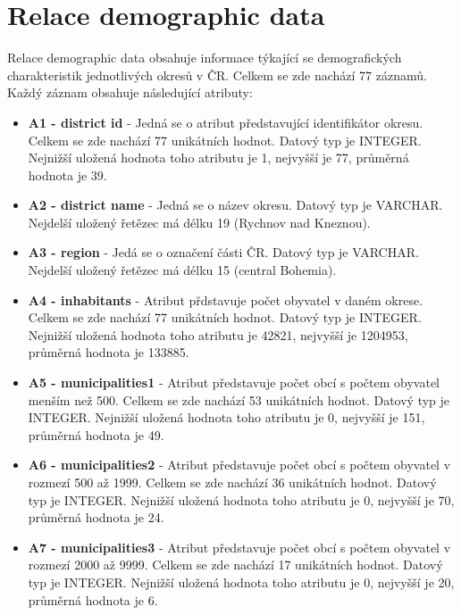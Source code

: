 \documentclass{article}
\begin{document}
\section{Relace demographic data}

Relace demographic data obsahuje informace týkající se demografických charakteristik jednotlivých okresů v ČR. Celkem se zde nachází 77 záznamů. Každý záznam obsahuje následující atributy:


\begin{itemize}

				
	\item \textbf{A1 - district id} -  Jedná se o atribut představující identifikátor okresu. Celkem se zde nachází 77 unikátních hodnot. Datový typ je INTEGER. Nejnižší uložená hodnota toho atributu je 1, nejvyšší je 77, průměrná hodnota je 39.
	
	\item \textbf{A2 - district name} -  Jedná se o název okresu. Datový typ je VARCHAR. Nejdelší uložený řetězec má délku 19 (Rychnov nad Kneznou).
 
	
	\item \textbf{A3 - region} -  Jedá se o označení části ČR. Datový typ je VARCHAR. Nejdelší uložený řetězec má délku 15 (central Bohemia).
	
	\item \textbf{A4 - inhabitants} -  Atribut přdstavuje počet obyvatel v daném okrese. Celkem se zde nachází 77 unikátních hodnot. Datový typ je INTEGER. Nejnižší uložená hodnota toho atributu je 42821, nejvyšší je 1204953, průměrná hodnota je 133885.
	
	\item \textbf{A5 - municipalities1} -  Atribut představuje počet obcí s počtem obyvatel menším než 500. Celkem se zde nachází 53 unikátních hodnot. Datový typ je INTEGER. Nejnižší uložená hodnota toho atributu je 0, nejvyšší je 151, průměrná hodnota je 49.
	
	
	\item \textbf{A6 - municipalities2} - Atribut představuje počet obcí s počtem obyvatel v rozmezí 500 až 1999. Celkem se zde nachází 36 unikátních hodnot. Datový typ je INTEGER. Nejnižší uložená hodnota toho atributu je 0, nejvyšší je 70, průměrná hodnota je 24. 
	
	\item \textbf{A7 - municipalities3} - Atribut představuje počet obcí s počtem obyvatel v rozmezí 2000 až 9999. Celkem se zde nachází 17 unikátních hodnot. Datový typ je INTEGER. Nejnižší uložená hodnota toho atributu je 0, nejvyšší je 20, průměrná hodnota je 6.  
	

\end{itemize}
\end{document}

